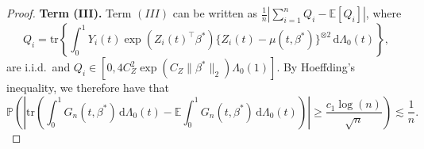 \documentclass[11pt]{article}
\newcommand{\dint}{\,\mathrm{d}}
\begin{document}
\begin{proof}
\noindent \textbf{Term (III).} Term $(III)$ can be written as $\frac{1}{n}|\sum_{i=1}^n Q_i - \mathbb{E}[Q_i]|$, where
\begin{equation*}
Q_i = \mathrm{tr} \left\{ \int_0^1 Y_i(t) \exp(Z_i(t)^\top \beta^*) \{Z_i(t) - \mu(t, \beta^*)\}^{\otimes 2} \dint \Lambda_0(t)\right\},
\end{equation*}
are i.i.d.~and $Q_i \in [0, 4C_Z^2 \exp(C_Z\|\beta^*\|_2) \Lambda_0(1)]$. By Hoeffding's inequality, we therefore have that 
\begin{equation*}
    \mathbb{P} \left(\left| \mathrm{tr} \left(\int_0^{1} G_n(t, \beta^*) \dint \Lambda_0(t) - \mathbb{E} \int_0^{1} G_n(t, \beta^*)\dint \Lambda_0(t)  \right)\right| \geq \frac{c_1 \log(n)}{\sqrt{n}}\right) \lesssim \frac{1}{n}.
\end{equation*}
\end{proof}
\end{document}
